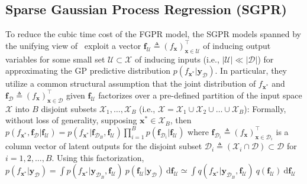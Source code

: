 \documentclass[conference]{IEEEtran}
\begin{document}
	\subsection{Sparse Gaussian Process Regression (SGPR)}
	\label{sgpr}%
	To reduce the cubic time cost of the FGPR model, 		
	the SGPR models spanned by the unifying view of~\cite{candela05} exploit a vector $\mathbf{f}_\mathcal{U}\triangleq (f_{\mathbf{x}})_{\mathbf{x}\in\mathcal{U}}^\top$ of inducing output variables for some small set $\mathcal{U}\subset\mathcal{X}$ of inducing inputs (i.e., $|\mathcal{U}|\ll|\mathcal{D}|$) for approximating the GP predictive distribution $p(f_{\mathbf{x}^*}|\mathbf{y}_\mathcal{D})$. In particular, they utilize a common structural assumption \cite{Snelson07a} that the joint distribution of $f_{\mathbf{x}^*}$ and $\mathbf{f}_\mathcal{D} \triangleq (f_{\mathbf{x}})_{\mathbf{x}\in\mathcal{D}}^\top$ given $\mathbf{f}_\mathcal{U}$ factorizes over a pre-defined partition of the input space $\mathcal{X}$ into $B$ disjoint subsets $\mathcal{X}_1,\ldots,\mathcal{X}_{B}$ (i.e., $\mathcal{X} = \mathcal{X}_1 \cup \mathcal{X}_2 \cup \ldots \cup \mathcal{X}_{B}$): 
%	
Formally, without loss of generality, supposing $\mathbf{x}^* \in \mathcal{X}_B$, %
then $p(f_{\mathbf{x}^*},\mathbf{f}_\mathcal{D}|\mathbf{f}_\mathcal{U}) = p(f_{\mathbf{x}^*}|\mathbf{f}_{\mathcal{D}_B},\mathbf{f}_\mathcal{U}) \prod_{i=1}^{B}p(\mathbf{f}_{\mathcal{D}_i}|\mathbf{f}_\mathcal{U})$
	where $\mathbf{f}_{\mathcal{D}_i} \triangleq (f_{\mathbf{x}})_{\mathbf{x}\in\mathcal{D}_i}^\top$ is a column vector of latent outputs for the disjoint subset $\mathcal{D}_i \triangleq (\mathcal{X}_i \cap \mathcal{D}) \subset \mathcal{D}$ for $i = 1, 2, \ldots, B$. Using this factorization,   
$p(f_{\mathbf{x}^*}|\mathbf{y}_\mathcal{D}) = \int p(f_{\mathbf{x}^*}|\mathbf{y}_{\mathcal{D}_B},\mathbf{f}_\mathcal{U})\ p(\mathbf{f}_\mathcal{U}|\mathbf{y}_\mathcal{D})\ \mathrm{d}\mathbf{f}_\mathcal{U} \simeq \int q(f_{\mathbf{x}^*}|\mathbf{y}_{\mathcal{D}_B},\mathbf{f}_\mathcal{U})\ q(\mathbf{f}_\mathcal{U})\ \mathrm{d}\mathbf{f}_\mathcal{U}$	
\end{document}
